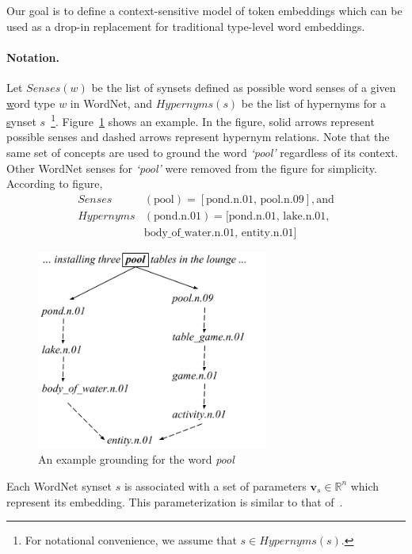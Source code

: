 Our goal is to define a context-sensitive model of token embeddings which can be
used as a drop-in replacement for traditional type-level word embeddings.

\paragraph{Notation.} Let $\textit{Senses}(w)$ be the list of synsets defined as
possible word senses of a given \underline{w}ord type $w$ in WordNet, and
$\textit{Hypernyms}(s)$ be the list of hypernyms for a \underline{s}ynset
$s$~\footnote{For notational convenience, we assume that $s \in
\textit{Hypernyms}(s)$.}. Figure~\ref{fig:ontolstm_wordnet_grounding} shows an
example. In the figure, solid arrows represent possible senses and dashed arrows
represent hypernym relations. Note that the same set of concepts are used to
ground the word \textit{`pool'} regardless of its context.  Other WordNet senses
for \textit{`pool'} were removed from the figure for simplicity. According to
figure, \begin{align} \textit{Senses}&(\text{pool}) = [\text{pond.n.01,
	pool.n.09}], \text{and} \nonumber \\
	\textit{Hypernyms}&(\text{pond.n.01}) = [\text{pond.n.01, lake.n.01},
	\nonumber \\ &\text{body\_of\_water.n.01, entity.n.01}] \nonumber
\end{align}

\begin{figure} \begin{center}
\includegraphics[width=3in]{figures/ontolstm_wordnet_grounding.png} \caption{An
example grounding for the word
\textit{pool}}\label{fig:ontolstm_wordnet_grounding} \end{center} \end{figure}
Each WordNet synset $s$ is associated with a set of parameters $\mathbf{v}_s \in
\mathbb{R}^n$ which represent its embedding.  This parameterization is similar
to that of~\cite{rothe:15}.

